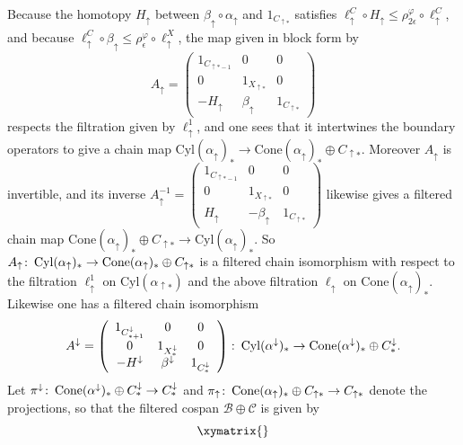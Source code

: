 \documentclass[11pt]{amsart}
\theoremstyle{definition}
\theoremstyle{remark}
\numberwithin{equation}{section}
\def\co{\colon\thinspace}
\def\ep{\epsilon}
\begin{document}
Because the homotopy $H_{\uparrow}$ between $\beta_{\uparrow}\circ\alpha_{\uparrow}$ and $1_{C_{\uparrow *}}$ satisfies $\ell_{\uparrow}^{C}\circ H_{\uparrow}\leq \rho_{2\ep}^{\varphi}\circ\ell_{\uparrow}^{C}$, and because $\ell_{\uparrow}^{C}\circ\beta_{\uparrow}\leq \rho_{\ep}^{\varphi}\circ\ell_{\uparrow}^{X}$, the map  given in block form by \[ A_{\uparrow}=\left(\begin{array}{ccc} 1_{C_{\uparrow *-1}} &  0 & 0 \\ 0 & 1_{X_{\uparrow *}} & 0 \\ -H_{\uparrow} & \beta_{\uparrow} & 1_{C_{\uparrow *}}   \end{array}\right) \] respects the filtration given by $\ell_{\uparrow}^{1}$, and one sees that it intertwines the boundary operators to give a chain map $\mathrm{Cyl}(\alpha_{\uparrow})_*\to \mathrm{Cone}(\alpha_{\uparrow})_*\oplus C_{\uparrow *}$.  Moreover $A_{\uparrow}$ is invertible, and its inverse $A_{\uparrow}^{-1}=\left(\begin{array}{ccc} 1_{C_{\uparrow *-1}} &  0 & 0 \\ 0 & 1_{X_{\uparrow *}} & 0 \\ H_{\uparrow} & -\beta_{\uparrow} & 1_{C_{\uparrow *}}   \end{array}\right)$ likewise gives a filtered chain map $\mathrm{Cone}(\alpha_{\uparrow})_*\oplus C_{\uparrow *}\to \mathrm{Cyl}(\alpha_{\uparrow})_*$.    So $A_{\uparrow}\co \mathrm{Cyl}(\alpha_{\uparrow})_*\to \mathrm{Cone}(\alpha_{\uparrow})_*\oplus C_{\uparrow *}$ is a filtered chain isomorphism with respect to the filtration $\ell_{\uparrow}^{1}$ on $\mathrm{Cyl}(\alpha_{\uparrow *})$ and the above filtration $\ell_{\uparrow}$ on $\mathrm{Cone}(\alpha_{\uparrow})_*$.  Likewise one has a filtered chain isomorphism \[  A^{\downarrow}= \left(\begin{array}{ccc}1_{C^{\downarrow}_{*+1}} & 0 & 0 \\ 0 & 1_{X^{\downarrow}_*} & 0 \\ -H^{\downarrow} & \beta^{\downarrow} & 1_{C^{\downarrow}_*}\end{array}\right)\co \mathrm{Cyl}(\alpha^{\downarrow})_*\to \mathrm{Cone}(\alpha^{\downarrow})_*\oplus C^{\downarrow}_{*}.    \]  Let $\pi^{\downarrow}\co \mathrm{Cone}(\alpha^{\downarrow})_*\oplus C^{\downarrow}_{*}\to C^{\downarrow}_{*}$ and $\pi_{\uparrow}\co \mathrm{Cone}(\alpha_{\uparrow})_{*}\oplus C_{\uparrow *}\to C_{\uparrow *}$ denote the projections, so that the filtered cospan $\mathcal{B}\oplus \mathcal{C}$ is given by \[ \xymatrix{
}\]
\end{document}
